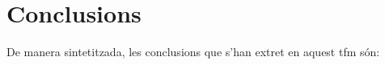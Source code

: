 \documentclass[CAT,BIB]{TFUOC}%
\begin{document}
    \section{Conclusions}
    \label{s:conclusions}

        De manera sintetitzada,
        les conclusions que s'han extret en aquest \gls{tfm} són:
\end{document}
